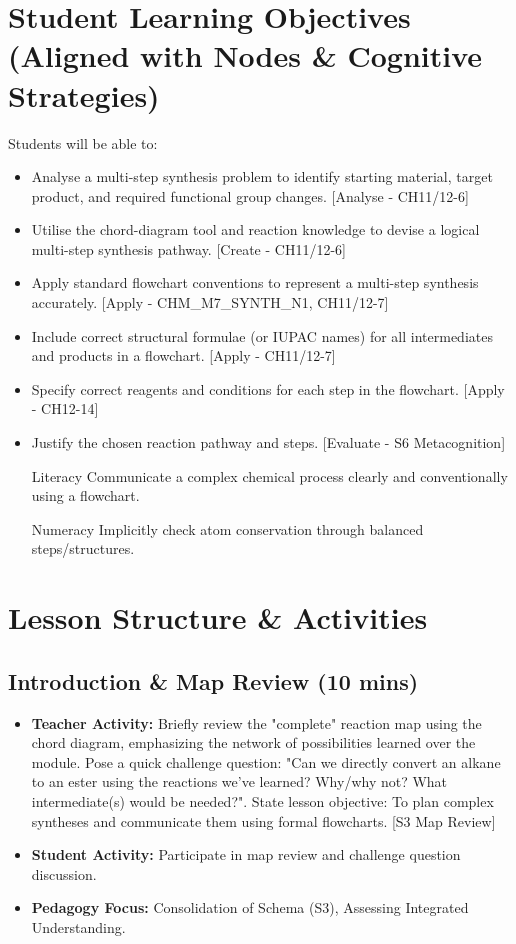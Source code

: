 \documentclass[11pt, a4paper]{article}
\begin{document}
\section*{Student Learning Objectives (Aligned with Nodes \& Cognitive Strategies)}
Students will be able to:
\begin{itemize}
    \item Analyse a multi-step synthesis problem to identify starting material, target product, and required functional group changes. [Analyse - CH11/12-6]
    \item Utilise the chord-diagram tool and reaction knowledge to devise a logical multi-step synthesis pathway. [Create - CH11/12-6]
    \item Apply standard flowchart conventions to represent a multi-step synthesis accurately. [Apply - CHM\_M7\_SYNTH\_N1, CH11/12-7]
    \item Include correct structural formulae (or IUPAC names) for all intermediates and products in a flowchart. [Apply - CH11/12-7]
    \item Specify correct reagents and conditions for each step in the flowchart. [Apply - CH12-14]
    \item Justify the chosen reaction pathway and steps. [Evaluate - S6 Metacognition]
    \item [Literacy] Communicate a complex chemical process clearly and conventionally using a flowchart.
    \item [Numeracy] Implicitly check atom conservation through balanced steps/structures.
\end{itemize}

\section*{Lesson Structure \& Activities}

\subsection*{Introduction \& Map Review (10 mins)}
\begin{itemize}
    \item \textbf{Teacher Activity:} Briefly review the "complete" reaction map using the chord diagram, emphasizing the network of possibilities learned over the module. Pose a quick challenge question: "Can we directly convert an alkane to an ester using the reactions we've learned? Why/why not? What intermediate(s) would be needed?". State lesson objective: To plan complex syntheses and communicate them using formal flowcharts. [S3 Map Review]
    \item \textbf{Student Activity:} Participate in map review and challenge question discussion.
    \item \textbf{Pedagogy Focus:} Consolidation of Schema (S3), Assessing Integrated Understanding.
\end{itemize}
\end{document}

